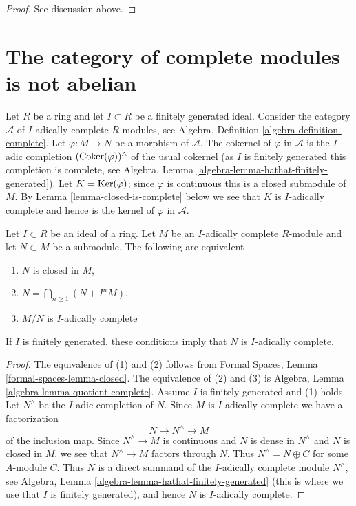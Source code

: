 \begin{proof}
See discussion above.
\end{proof}



\section{The category of complete modules is not abelian}
\label{section-non-abelian}

\noindent
Let $R$ be a ring and let $I \subset R$ be a finitely generated ideal.
Consider the category $\mathcal{A}$ of $I$-adically complete
$R$-modules, see
Algebra, Definition \ref{algebra-definition-complete}.
Let $\varphi : M \to N$ be a morphism of $\mathcal{A}$.
The cokernel of $\varphi$ in $\mathcal{A}$ is the $I$-adic completion
$(\mathop{\mathrm{Coker}}(\varphi))^\wedge$ of the usual cokernel
(as $I$ is finitely generated this completion is complete, see
Algebra, Lemma \ref{algebra-lemma-hathat-finitely-generated}).
Let $K = \mathop{\mathrm{Ker}}(\varphi)$; since $\varphi$ is continuous this
is a closed submodule of $M$. By Lemma \ref{lemma-closed-is-complete}
below we see that $K$ is $I$-adically complete and hence is the
kernel of $\varphi$ in $\mathcal{A}$.

\begin{lemma}
\label{lemma-closed-is-complete}
Let $I \subset R$ be an ideal of a ring. Let $M$ be an $I$-adically complete
$R$-module and let $N \subset M$ be a submodule. The following are equivalent
\begin{enumerate}
\item $N$ is closed in $M$,
\item $N = \bigcap_{n \geq 1} (N + I^n M)$,
\item $M/N$ is $I$-adically complete
\end{enumerate}
If $I$ is finitely generated, these conditions imply that $N$
is $I$-adically complete.
\end{lemma}

\begin{proof}
The equivalence of (1) and (2) follows from
Formal Spaces, Lemma \ref{formal-spaces-lemma-closed}.
The equivalence of (2) and (3) is
Algebra, Lemma \ref{algebra-lemma-quotient-complete}.
Assume $I$ is finitely generated and (1) holds.
Let $N^\wedge$ be the $I$-adic completion of $N$. Since $M$
is $I$-adically complete we have a factorization
$$
N \to N^\wedge \to M
$$
of the inclusion map. Since $N^\wedge \to M$ is continuous and
$N$ is dense in $N^\wedge$ and $N$ is closed in $M$, we see that
$N^\wedge \to M$ factors through $N$. Thus $N^\wedge = N \oplus C$
for some $A$-module $C$. Thus $N$ is a direct summand of the
$I$-adically complete module $N^\wedge$, see
Algebra, Lemma \ref{algebra-lemma-hathat-finitely-generated}
(this is where we use that $I$ is finitely generated),
and hence $N$ is $I$-adically complete.
\end{proof}

